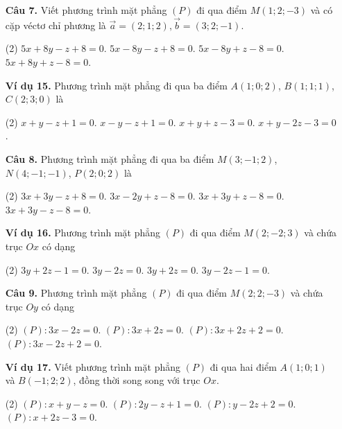 \documentclass[12pt, a4paper]{article}
\renewcommand{\vec}[1]{\overrightarrow{#1}}
\begin{document}
\begin{enumerate}[label=\textbf{\arabic*.}, wide=0pt, leftmargin=*]
    \item[\textbf{Câu 7.}] Viết phương trình mặt phẳng \((P)\) đi qua điểm \(M(1;2;-3)\) và có cặp véctơ chỉ phương là \(\vec{a}=(2;1;2), \vec{b}=(3;2;-1)\).
    \begin{tasks}(2)
        \task \(5x + 8y - z + 8 = 0\).
        \task \(5x - 8y - z + 8 = 0\).
        \task \(5x - 8y + z - 8 = 0\).
        \task \(5x + 8y + z - 8 = 0\).
    \end{tasks}
    
    \item[\textbf{Ví dụ 15.}] Phương trình mặt phẳng đi qua ba điểm \(A(1;0;2)\), \(B(1;1;1)\), \(C(2;3;0)\) là
    \begin{tasks}(2)
        \task \(x+y-z+1=0\).
        \task \(x-y-z+1=0\).
        \task \(x+y+z-3=0\).
        \task \(x+y-2z-3=0\).
    \end{tasks}

    \item[\textbf{Câu 8.}] Phương trình mặt phẳng đi qua ba điểm \(M(3;-1;2)\), \(N(4;-1;-1)\), \(P(2;0;2)\) là
    \begin{tasks}(2)
        \task \(3x + 3y - z + 8 = 0\).
        \task \(3x - 2y + z - 8 = 0\).
        \task \(3x + 3y + z - 8 = 0\).
        \task \(3x + 3y - z - 8 = 0\).
    \end{tasks}

    
    \item[\textbf{Ví dụ 16.}] Phương trình mặt phẳng \((P)\) đi qua điểm \(M(2;-2;3)\) và chứa trục \(Ox\) có dạng
    \begin{tasks}(2)
        \task \(3y+2z-1=0\).
        \task \(3y-2z=0\).
        \task \(3y+2z=0\).
        \task \(3y-2z-1=0\).
    \end{tasks}
    
    \item[\textbf{Câu 9.}] Phương trình mặt phẳng \((P)\) đi qua điểm \(M(2;2;-3)\) và chứa trục \(Oy\) có dạng
    \begin{tasks}(2)
        \task \((P): 3x-2z=0\).
        \task \((P): 3x+2z=0\).
        \task \((P): 3x+2z+2=0\).
        \task \((P): 3x-2z+2=0\).
    \end{tasks}
    
    \item[\textbf{Ví dụ 17.}] Viết phương trình mặt phẳng \((P)\) đi qua hai điểm \(A(1;0;1)\) và \(B(-1;2;2)\), đồng thời song song với trục \(Ox\).
    \begin{tasks}(2)
        \task \((P): x+y-z=0\).
        \task \((P): 2y-z+1=0\).
        \task \((P): y-2z+2=0\).
        \task \((P): x+2z-3=0\).
    \end{tasks}
    

\end{enumerate}
\end{document}
